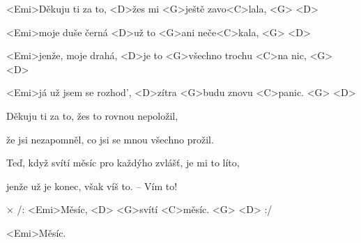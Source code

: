 

\zs
<Emi>Děkuju ti za to, <D>žes mi <G>ještě zavo<C>lala, <G> <D>

<Emi>moje duše černá <D>už to <G>ani neče<C>kala, <G> <D>

<Emi>jenže, moje drahá, <D>je to <G>všechno trochu <C>na nic, <G> <D>

<Emi>já už jsem se rozhod', <D>zítra <G>budu znovu <C>panic. <G> <D>
\ks

\zs
Děkuju ti za to, žes to rovnou nepoložil,

že jsi nezapomněl, co jsi se mnou všechno prožil.

Teď, když svítí měsíc pro každýho zvlášť, je mi to líto,

jenže už je konec, však víš to. -- Vím to!
\ks

× /: <Emi>Měsíc, <D> <G>svítí <C>měsíc. <G> <D> :/

<Emi>Měsíc.
\kr

\kp
